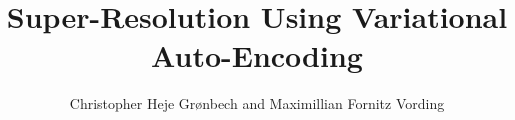 \documentclass[british]{report}
\title{Super-Resolution Using Variational Auto-Encoding}
\author{Christopher Heje Grønbech and Maximillian Fornitz Vording}
\date{\printdate{2016-05-26}}
\affiliation{DTU Compute, Technical University of Denmark}
\begin{document}
	
	\mainmatter
	
	\maketitle
	
	
	
	
	
	
	
	
	
	
	
	
	
	
	
	
	
	\backmatter
	
	\appendices
	
	
	
\end{document}

